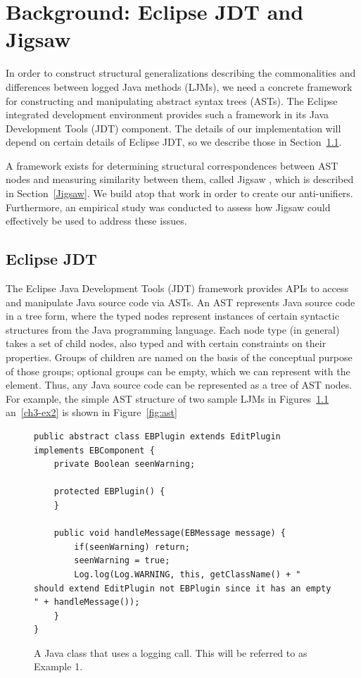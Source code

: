 \chapter{Background: Eclipse JDT and Jigsaw}\label{background2}

In order to construct structural generalizations describing the commonalities and differences between logged Java methods (LJMs), we need a concrete framework for constructing and manipulating abstract syntax trees (ASTs).  The Eclipse integrated development environment provides such a framework in its Java Development Tools (JDT) component.  The details of our implementation will depend on certain details of Eclipse JDT, so we describe those in Section~\ref{JDT}.

A framework exists for determining structural correspondences between AST nodes and measuring similarity between them, called Jigsaw \cite{2008:fse:cottrell}, which is described in Section~\ref{Jigsaw}. We build atop that work in order to create our anti-unifiers. Furthermore, an empirical study was conducted to assess how Jigsaw could effectively be used to address these issues.

\section{Eclipse JDT}\label{JDT}

The Eclipse Java Development Tools (JDT) framework provides APIs to access and manipulate Java source code via ASTs. An AST represents Java source code in a tree form, where the typed nodes represent instances of certain syntactic structures from the Java programming language.  Each node type (in general) takes a set of child nodes, also typed and with certain constraints on their properties.  Groups of children are named on the basis of the conceptual purpose of those groups; optional groups can be empty, which we can represent with the \NIL{} element. Thus, any Java source code can be represented as a tree of AST nodes. For example, the simple AST structure of two sample LJMs in Figures~\ref{ch3-ex1} an~\ref{ch3-ex2} is shown in Figure~\ref{fig:ast}

\begin{figure}[p]
\def\baselinestretch{1}
\begin{lstlisting}
public abstract class EBPlugin extends EditPlugin implements EBComponent {
    private Boolean seenWarning;

    protected EBPlugin() {
    }

    public void handleMessage(EBMessage message) {
        if(seenWarning) return;
        seenWarning = true;
        Log.log(Log.WARNING, this, getClassName() + " should extend EditPlugin not EBPlugin since it has an empty " + handleMessage());
    }
}
\end{lstlisting}
\caption{A Java class that uses a logging call. This will be referred to as Example 1.\label{ch3-ex1}}
\end{figure}

